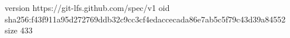 version https://git-lfs.github.com/spec/v1
oid sha256:f43f911a95d272769ddb32c9cc3cf4edaccecada86e7ab5c5f79c43d39a84552
size 433
